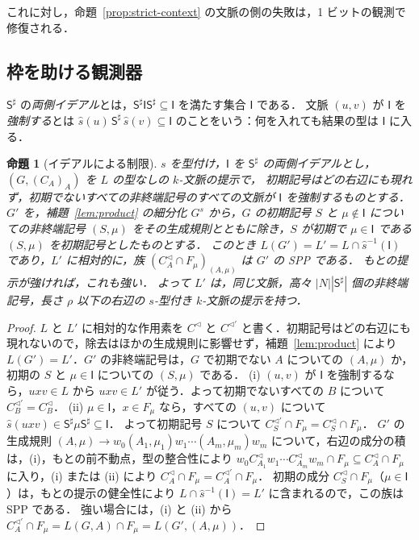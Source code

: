 \documentclass[11pt,a4paper]{ltjsarticle}
\numberwithin{equation}{section}
\theoremstyle{plain}
\newtheorem{proposition}[theorem]{命題}
\theoremstyle{definition}
\theoremstyle{remark}
\theoremstyle{plain}
\newcommand{\Lc}{^{\lhd}}
\begin{document}
これに対し，命題~\ref{prop:strict-context} の文脈の側の失敗は，1 ビットの観測で修復される．

\subsection*{枠を助ける観測器}

$\mathsf S^\sharp$ の\emph{両側イデアル}とは，$\mathsf S^\sharp\mathsf I\mathsf S^\sharp\subseteq\mathsf I$ を満たす集合 $\mathsf I$ である．
文脈 $(u,v)$ が $\mathsf I$ を\emph{強制する}とは $\widehat s(u)\,\mathsf S^\sharp\,\widehat s(v)\subseteq\mathsf I$ のことをいう：何を入れても結果の型は $\mathsf I$ に入る．

\begin{proposition}[イデアルによる制限]\label{prop:ideal}
$s$ を型付け，$\mathsf I$ を $\mathsf S^\sharp$ の両側イデアルとし，$(G,(C_A)_A)$ を $L$ の型なしの $k$-文脈の提示で，
初期記号はどの右辺にも現れず，初期でないすべての非終端記号のすべての文脈が $\mathsf I$ を強制するものとする．
$G'$ を，補題~\ref{lem:product} の細分化 $G^s$ から，$G$ の初期記号 $S$ と $\mu\notin\mathsf I$ についての非終端記号 $(S,\mu)$ をその生成規則とともに除き，$S$ が初期で $\mu\in\mathsf I$ である $(S,\mu)$ を初期記号としたものとする．
このとき $L(G')=L'=L\cap\widehat s^{-1}(\mathsf I)$ であり，$L'$ に相対的に，族 $(C_A\Lc\cap F_\mu)_{(A,\mu)}$ は $G'$ の SPP である．
もとの提示が強ければ，これも強い．
よって $L'$ は，同じ文脈，高々 $|N||\mathsf S^\sharp|$ 個の非終端記号，長さ $\rho$ 以下の右辺の $s$-型付き $k$-文脈の提示を持つ．
\end{proposition}
\begin{proof}
$L$ と $L'$ に相対的な作用素を $C\Lc$ と $C^{\lhd'}$ と書く．初期記号はどの右辺にも現れないので，除去はほかの生成規則に影響せず，補題~\ref{lem:product} により $L(G')=L'$．$G'$ の非終端記号は，$G$ で初期でない $A$ についての $(A,\mu)$ か，初期の $S$ と $\mu\in\mathsf I$ についての $(S,\mu)$ である．
(i) $(u,v)$ が $\mathsf I$ を強制するなら，$uxv\in L$ から $uxv\in L'$ が従う．よって初期でないすべての $B$ について $C_B^{\lhd'}=C_B\Lc$．
(ii) $\mu\in\mathsf I$，$x\in F_\mu$ なら，すべての $(u,v)$ について $\widehat s(uxv)\in\mathsf S^\sharp\mu\mathsf S^\sharp\subseteq\mathsf I$．
よって初期記号 $S$ について $C_S^{\lhd'}\cap F_\mu=C_S\Lc\cap F_\mu$．
$G'$ の生成規則 $(A,\mu)\to w_0(A_1,\mu_1)w_1\cdots(A_m,\mu_m)w_m$ について，右辺の成分の積は，(i)，もとの前不動点，型の整合性により
$w_0C_{A_1}\Lc w_1\cdots C_{A_m}\Lc w_m\cap F_\mu\subseteq C_A\Lc\cap F_\mu$ に入り，(i) または (ii) により $C_A\Lc\cap F_\mu=C_A^{\lhd'}\cap F_\mu$．
初期の成分 $C_S\Lc\cap F_\mu$（$\mu\in\mathsf I$）は，もとの提示の健全性により $L\cap\widehat s^{-1}(\mathsf I)=L'$ に含まれるので，この族は SPP である．
強い場合には，(i) と (ii) から $C_A^{\lhd'}\cap F_\mu=L(G,A)\cap F_\mu=L(G',(A,\mu))$．
\end{proof}
\end{document}
